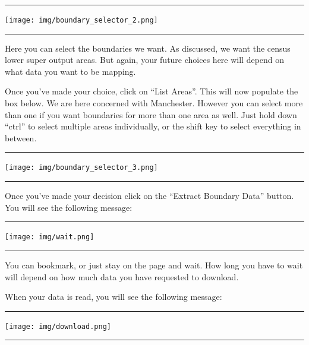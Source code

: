 \documentclass[]{book}
\begin{document}
\begin{center}\rule{0.5\linewidth}{0.5pt}\end{center}

\texttt{[image: img/boundary\_selector\_2.png]}

\begin{center}\rule{0.5\linewidth}{0.5pt}\end{center}

Here you can select the boundaries we want. As discussed, we want the census lower super output areas. But again, your future choices here will depend on what data you want to be mapping.

Once you've made your choice, click on ``List Areas''. This will now populate the box below. We are here concerned with Manchester. However you can select more than one if you want boundaries for more than one area as well. Just hold down ``ctrl'' to select multiple areas individually, or the shift key to select everything in between.

\begin{center}\rule{0.5\linewidth}{0.5pt}\end{center}

\texttt{[image: img/boundary\_selector\_3.png]}

\begin{center}\rule{0.5\linewidth}{0.5pt}\end{center}

Once you've made your decision click on the ``Extract Boundary Data'' button. You will see the following message:

\begin{center}\rule{0.5\linewidth}{0.5pt}\end{center}

\texttt{[image: img/wait.png]}

\begin{center}\rule{0.5\linewidth}{0.5pt}\end{center}

You can bookmark, or just stay on the page and wait. How long you have to wait will depend on how much data you have requested to download.

When your data is read, you will see the following message:

\begin{center}\rule{0.5\linewidth}{0.5pt}\end{center}

\texttt{[image: img/download.png]}

\begin{center}\rule{0.5\linewidth}{0.5pt}\end{center}
\end{document}
